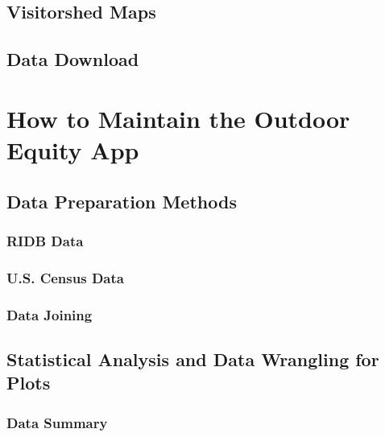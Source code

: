 \documentclass[
]{book}
\begin{document}
\hypertarget{visitorshed-maps}{%
\subsection{Visitorshed Maps}\label{visitorshed-maps}}

\hypertarget{data-download}{%
\subsection{Data Download}\label{data-download}}

\hypertarget{how-to-maintain-the-outdoor-equity-app}{%
\section{How to Maintain the Outdoor Equity App}\label{how-to-maintain-the-outdoor-equity-app}}

\hypertarget{data-preparation-methods}{%
\subsection{Data Preparation Methods}\label{data-preparation-methods}}

\hypertarget{ridb-data}{%
\subsubsection{RIDB Data}\label{ridb-data}}

\hypertarget{u.s.-census-data}{%
\subsubsection{U.S. Census Data}\label{u.s.-census-data}}

\hypertarget{data-joining}{%
\subsubsection{Data Joining}\label{data-joining}}

\hypertarget{statistical-analysis-and-data-wrangling-for-plots}{%
\subsection{Statistical Analysis and Data Wrangling for Plots}\label{statistical-analysis-and-data-wrangling-for-plots}}

\hypertarget{data-summary-1}{%
\subsubsection{Data Summary}\label{data-summary-1}}
\end{document}
